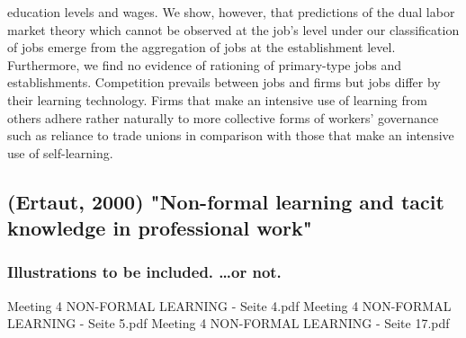 \documentclass[12pt,a4paper]{article}
\begin{document}
  education levels and wages. We show, however, that predictions of the dual labor market theory which
  cannot be observed at the job’s level under our classification of jobs emerge from the aggregation
  of jobs at the establishment level. Furthermore, we find no evidence of rationing of primary-type
  jobs and establishments. Competition prevails between jobs and firms but jobs differ by their
  learning technology. Firms that make an intensive use of learning from others adhere rather
  naturally to more collective forms of workers’ governance such as reliance to trade unions in
  comparison with those that make an intensive use of self-learning.

  \subsection{(Ertaut, 2000) "Non-formal learning and tacit knowledge in professional work"} %
  \label{sec:Ertaut2000}

  \subsubsection{Illustrations to be included. …or not.}
Meeting 4 NON-FORMAL LEARNING - Seite 4.pdf
Meeting 4 NON-FORMAL LEARNING - Seite 5.pdf
Meeting 4 NON-FORMAL LEARNING - Seite 17.pdf
\end{document}
